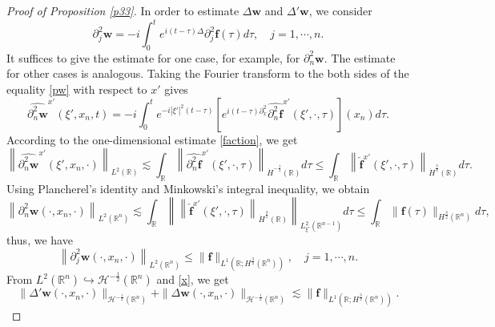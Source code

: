 \documentclass[10pt,a4paper]{amsart}
\begin{document}
\begin{proof}[Proof of Proposition \ref{p33}]
	In order to estimate $\Delta \boldsymbol{w}$ and $\Delta' \boldsymbol{w}$, we consider
	\begin{equation}\label{pw}
		\partial_{j}^{2} \boldsymbol{w} =-i\int_{0}^{t}e^{i(t-\tau)\Delta} \partial_{j}^{2}\boldsymbol{f}(\tau)d\tau,\quad j=1,\cdots,n.
	\end{equation}
	It suffices to give the estimate for one case, for example, for $\partial_{n}^{2}\boldsymbol{w}$. The estimate for other cases is analogous.
	Taking the Fourier transform to the both sides of the equality \eqref{pw} with respect to $x'$ gives
	\begin{equation}\label{star}	\widehat{\partial_{n}^{2}\boldsymbol{w}}^{x'}(\xi',x_{n},t)=-i\int_{0}^{t}e^{-i|\xi'|^{2}(t-\tau)}\left[e^{i(t-\tau)\partial_{x}^{2}}\widehat{\partial_{n}^{2}\boldsymbol{f}}^{x'}(\xi',\cdot,\tau)\right](x_{n}) d\tau.
	\end{equation}
	According to the one-dimensional estimate \eqref{faction}, we get
	\begin{equation*} \left\|\widehat{\partial_{n}^{2}\boldsymbol{w}}^{x'}(\xi',x_{n},\cdot)\right\|_{L^{2}(\mathbb{R})}\lesssim \int_{\mathbb{R}} \left\|\widehat{\partial_{n}^{2}\boldsymbol{f}}^{x'}(\xi',\cdot,\tau)\right\|_{\dot{H}^{-\frac{1}{2}}(\mathbb{R})}d\tau\leq\int_{\mathbb{R}} \left\|\widehat{\boldsymbol{f}}^{x'}(\xi',\cdot,\tau)\right\|_{\dot{H}^{\frac{3}{2}}(\mathbb{R})}d\tau.
	\end{equation*}
	Using  Plancherel's identity and Minkowski's integral inequality, we obtain
	\begin{equation*}		\left\|\partial_{n}^{2}\boldsymbol{w}(\cdot,x_{n},\cdot)\right\|_{L^{2}(\mathbb{R}^{n})}\lesssim\int_{\mathbb{R}}\left\|\left\|\widehat{\boldsymbol{f}}^{x'}(\xi',\cdot,\tau)\right\|_{\dot{H}^{\frac{3}{2}}(\mathbb{R})}\right\|_{L^{2}_{\xi'}(\mathbb{R}^{n-1})}d\tau\leq\int_{\mathbb{R}}\|\boldsymbol{f}(\tau)\|_{H^{\frac{3}{2}}(\mathbb{R}^{n})}d\tau,
	\end{equation*}
	thus, we have
	\begin{equation}\label{x} \left\|\partial_{j}^{2}\boldsymbol{w}(\cdot,x_{n},\cdot)\right\|_{L^{2}(\mathbb{R}^{n})}\leq\|\boldsymbol{f}\|_{L^{1}(\mathbb{R};H^{\frac{3}{2}}(\mathbb{R}^{n}))},\quad j=1,\cdots,n.
	\end{equation}
	From $L^{2}(\mathbb{R}^{n})\hookrightarrow\mathcal{H}^{-\frac{1}{2}}(\mathbb{R}^{n})$ and \eqref{x}, we get
	\begin{equation}\label{del}		\|\Delta'\boldsymbol{w}(\cdot,x_{n},\cdot)\|_{\mathcal{H}^{-\frac{1}{2}}(\mathbb{R}^{n})}+\|\Delta\boldsymbol{w}(\cdot,x_{n},\cdot)\|_{\mathcal{H}^{-\frac{1}{2}}(\mathbb{R}^{n})}\lesssim\|\boldsymbol{f}\|_{L^{1}(\mathbb{R};H^{\frac{3}{2}}(\mathbb{R}^{n}))}.

\end{equation}
\end{proof}
\end{document}
